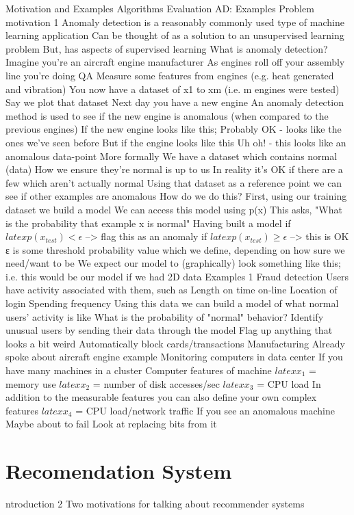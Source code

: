 Motivation and Examples
Algorithms
Evaluation
AD: Examples
Problem motivation 1
Anomaly detection is a reasonably commonly used type of machine learning application
Can be thought of as a solution to an unsupervised learning problem
But, has aspects of supervised learning
What is anomaly detection?
Imagine you're an aircraft engine manufacturer
As engines roll off your assembly line you're doing QA
Measure some features from engines (e.g. heat generated and vibration)
You now have a dataset of x1 to xm (i.e. m engines were tested)
Say we plot that dataset
Next day you have a new engine
An anomaly detection method is used to see if the new engine is anomalous (when compared to the previous engines)
If the new engine looks like this;
Probably OK - looks like the ones we've seen before
But if the engine looks like this
Uh oh! - this looks like an anomalous data-point
More formally
We have a dataset which contains normal (data)
How we ensure they're normal is up to us
In reality it's OK if there are a few which aren't actually normal
Using that dataset as a reference point we can see if other examples are anomalous
How do we do this?
First, using our training dataset we build a model
We can access this model using p(x)
This asks, "What is the probability that example x is normal"
Having built a model
if $latex p(x_{test}) < \epsilon$ --> flag this as an anomaly
if $latex p(x_{test}) \ge \epsilon$ --> this is OK
ε is some threshold probability value which we define, depending on how sure we need/want to be
We expect our model to (graphically) look something like this;
i.e. this would be our model if we had 2D data
Examples 1
Fraud detection
Users have activity associated with them, such as
Length on time on-line
Location of login
Spending frequency
Using this data we can build a model of what normal users' activity is like
What is the probability of "normal" behavior?
Identify unusual users by sending their data through the model
Flag up anything that looks a bit weird
Automatically block cards/transactions
Manufacturing
Already spoke about aircraft engine example
Monitoring computers in data center
If you have many machines in a cluster
Computer features of machine
$latex x_1$ = memory use
$latex x_2$ = number of disk accesses/sec
$latex x_3$ = CPU load
In addition to the measurable features you can also define your own complex features
$latex x_4$ = CPU load/network traffic
If you see an anomalous machine
Maybe about to fail
Look at replacing bits from it

\section{Recomendation System}
ntroduction 2
Two motivations for talking about recommender systems

